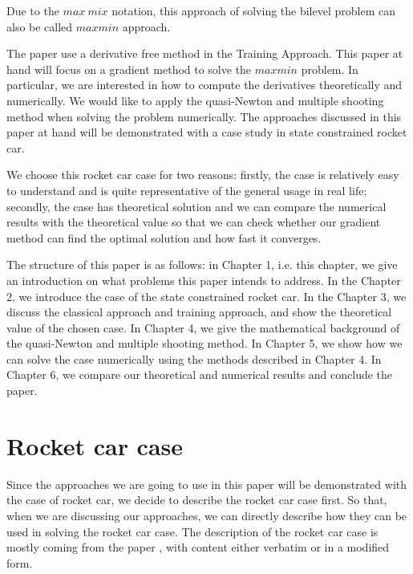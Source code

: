 	Due to the $max \ mix$ notation, this approach of solving the bilevel problem can also be called $max min$ approach. 
	
	The paper \cite{MatSch22} use a derivative free method in the Training Approach. This paper at hand will focus on a gradient method to solve the $maxmin$ problem.  In particular, we are interested in how to compute the derivatives theoretically and numerically.  We would like to apply the quasi-Newton and multiple shooting method when solving the problem numerically. The approaches discussed in this paper at hand will be demonstrated with a case study in state constrained rocket car. 
	
	We choose this rocket car case for two reasons: firstly, the case is relatively easy to understand and is quite representative of the general usage in real life; secondly, the case has theoretical solution and we can compare the numerical results with the theoretical value so that we can check whether our gradient method can find the optimal solution and how fast it converges. 
	
	The structure of this paper is as follows: in Chapter 1, i.e. this chapter,  we give an introduction on what problems this paper intends to address. In the Chapter 2, we introduce the case of the state constrained rocket car. In the Chapter 3, we discuss the classical approach and training approach, and show the theoretical value of the chosen case. In Chapter 4, we give the mathematical background of the quasi-Newton and multiple shooting method. In Chapter 5, we show how we can solve the case numerically using the methods described in Chapter 4. In Chapter 6, we compare our theoretical and numerical results and conclude the paper. 
	
	\label{Chapter1}
	
	
	
	
	\chapter{Rocket car case}
	Since the approaches we are going to use in this paper will be demonstrated with the case of rocket car, we decide to describe the rocket car case first. So that, when we are discussing our approaches, we can directly describe how they can be used in solving the rocket car case. The description of the rocket car case is mostly coming from the paper \cite{MatSch22}, with content either verbatim or in a modified form. 
	
